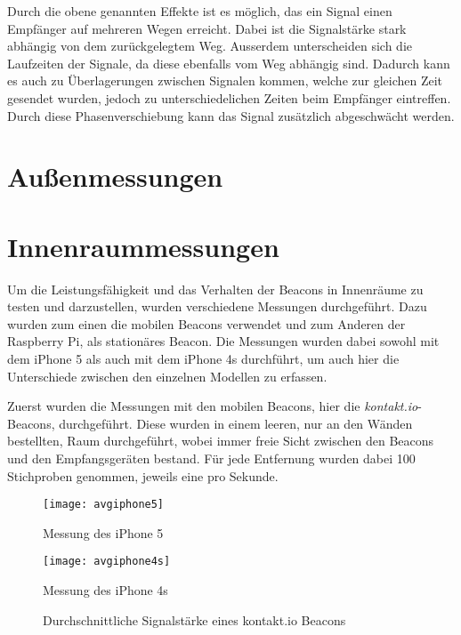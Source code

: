 Durch die obene genannten Effekte ist es möglich, das ein Signal einen Empfänger auf mehreren Wegen erreicht. Dabei ist die Signalstärke stark abhängig von dem zurückgelegtem Weg. Ausserdem unterscheiden sich die Laufzeiten der Signale, da diese ebenfalls vom Weg abhängig sind. Dadurch kann es auch zu Überlagerungen zwischen Signalen kommen, welche zur gleichen Zeit gesendet wurden, jedoch zu unterschiedelichen Zeiten beim Empfänger eintreffen. 
Durch diese Phasenverschiebung kann das Signal zusätzlich abgeschwächt werden.


\section{Außenmessungen}
\label{sec:dataandmeasurement:outdoormeasure}

\section{Innenraummessungen}
\label{sec:dataandmeasurement:indoormeasure}
Um die Leistungsfähigkeit und das Verhalten der Beacons in Innenräume zu testen und darzustellen, wurden verschiedene Messungen durchgeführt. Dazu wurden zum einen die mobilen Beacons verwendet und zum Anderen der Raspberry Pi, als stationäres Beacon.
Die Messungen wurden dabei sowohl mit dem iPhone 5 als auch mit dem iPhone 4s durchführt, um auch hier die Unterschiede zwischen den einzelnen Modellen zu erfassen.


Zuerst wurden die Messungen mit den mobilen Beacons, hier die \emph{kontakt.io}-Beacons, durchgeführt.
Diese wurden in einem leeren, nur an den Wänden bestellten, Raum durchgeführt, wobei immer freie Sicht zwischen den Beacons und den Empfangsgeräten bestand. Für jede Entfernung wurden dabei 100 Stichproben genommen, jeweils eine pro Sekunde.
\begin{figure}[h!]
	\centering
	\begin{minipage}[t]{5cm}
		\texttt{[image: avgiphone5]}
		\caption{Messung des iPhone 5}
		\label{avgiphone5-signalstrength}
	\end{minipage}
	\hspace{2cm}
	\begin{minipage}[t]{5cm}
			\texttt{[image: avgiphone4s]}
			\caption{Messung des iPhone 4s}
			\label{avgiphone4s-signalstrength}
	\end{minipage}
		\caption{Durchschnittliche Signalstärke eines kontakt.io Beacons}
		\label{signalstrength}
\end{figure}

